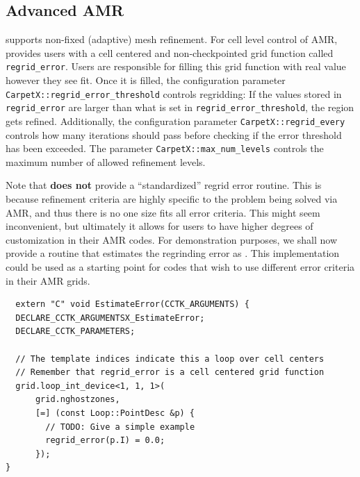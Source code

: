\subsection{Advanced AMR}
\label{sec:advanced_amr}

\CarpetX\space supports non-fixed (adaptive) mesh refinement. For cell level control of AMR, \CarpetXRegridError\space provides users with a cell centered and non-checkpointed grid function called \texttt{regrid\_error}. Users are responsible for filling this grid function with real value however they see fit. Once it is filled, the configuration parameter \texttt{CarpetX::regrid\_error\_threshold} controls regridding: If the values stored in \texttt{regrid\_error} are larger than what is set in \texttt{regrid\_error\_threshold}, the region gets refined. Additionally, the configuration parameter \texttt{CarpetX::regrid\_every} controls how many iterations should pass before checking if the error threshold has been exceeded. The parameter \texttt{CarpetX::max\_num\_levels} controls the maximum number of allowed refinement levels.

Note that \CarpetX\space \textbf{does not} provide a ``standardized'' regrid error routine. This is because refinement criteria are highly specific to the problem being solved via AMR, and thus there is no one size fits all error criteria. This might seem inconvenient, but ultimately it allows for users to have higher degrees of customization in their AMR codes. For demonstration purposes, we shall now provide a routine that estimates the regrinding error as . This implementation could be used as a starting point for codes that wish to use different error criteria in their AMR grids.

\begin{lstlisting}
  extern "C" void EstimateError(CCTK_ARGUMENTS) {
  DECLARE_CCTK_ARGUMENTSX_EstimateError;
  DECLARE_CCTK_PARAMETERS;

  // The template indices indicate this a loop over cell centers
  // Remember that regrid_error is a cell centered grid function
  grid.loop_int_device<1, 1, 1>(
      grid.nghostzones,
      [=] (const Loop::PointDesc &p) {
        // TODO: Give a simple example
        regrid_error(p.I) = 0.0;
      });
}
\end{lstlisting}

